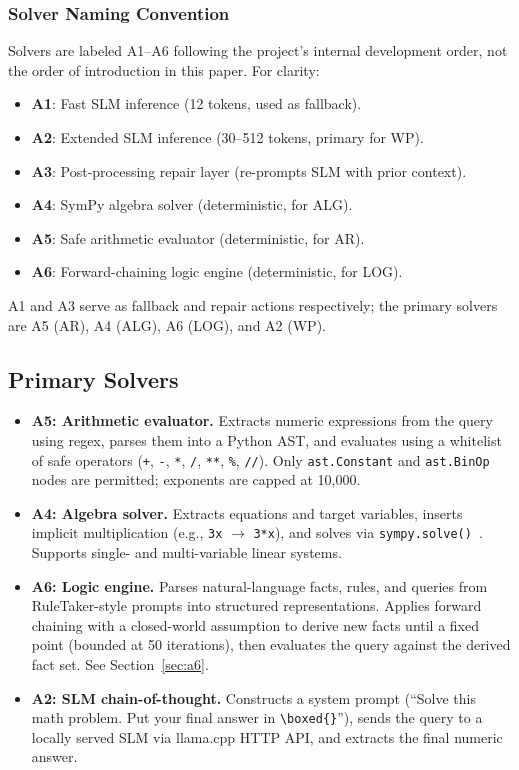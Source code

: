 \documentclass[journal]{IEEEtai}
\begin{document}
\subsubsection{Solver Naming Convention}
Solvers are labeled A1--A6 following the project's internal development order, not the order of introduction in this paper. For clarity:
\begin{itemize}
    \item \textbf{A1}: Fast SLM inference (12 tokens, used as fallback).
    \item \textbf{A2}: Extended SLM inference (30--512 tokens, primary for WP).
    \item \textbf{A3}: Post-processing repair layer (re-prompts SLM with prior context).
    \item \textbf{A4}: SymPy algebra solver (deterministic, for ALG).
    \item \textbf{A5}: Safe arithmetic evaluator (deterministic, for AR).
    \item \textbf{A6}: Forward-chaining logic engine (deterministic, for LOG).
\end{itemize}

A1 and A3 serve as fallback and repair actions respectively; the primary solvers are A5 (AR), A4 (ALG), A6 (LOG), and A2 (WP).

\subsection{Primary Solvers}

\begin{itemize}
    \item \textbf{A5: Arithmetic evaluator.} Extracts numeric expressions from the query using regex, parses them into a Python AST, and evaluates using a whitelist of safe operators (\texttt{+}, \texttt{-}, \texttt{*}, \texttt{/}, \texttt{**}, \texttt{\%}, \texttt{//}). Only \texttt{ast.Constant} and \texttt{ast.BinOp} nodes are permitted; exponents are capped at 10{,}000.
    \item \textbf{A4: Algebra solver.} Extracts equations and target variables, inserts implicit multiplication (e.g., \texttt{3x} $\rightarrow$ \texttt{3*x}), and solves via \texttt{sympy.solve()}~\cite{sympy2023}. Supports single- and multi-variable linear systems.
    \item \textbf{A6: Logic engine.} Parses natural-language facts, rules, and queries from RuleTaker-style prompts into structured representations. Applies forward chaining with a closed-world assumption to derive new facts until a fixed point (bounded at 50 iterations), then evaluates the query against the derived fact set. See Section~\ref{sec:a6}.
    \item \textbf{A2: SLM chain-of-thought.} Constructs a system prompt (``Solve this math problem. Put your final answer in \texttt{\textbackslash boxed\{\}}''), sends the query to a locally served SLM via llama.cpp HTTP API, and extracts the final numeric answer.
\end{itemize}
\end{document}
